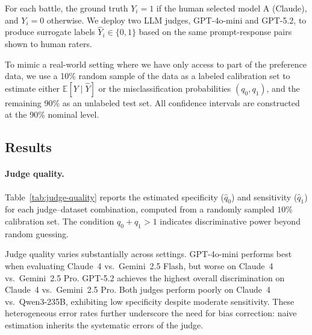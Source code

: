 \documentclass[11pt]{article}
\newcommand{\1}{\mathbf{1}}
\theoremstyle{remark}
\begin{document}
  For each battle, the ground truth $Y_i = 1$ if the human selected model A (Claude), and $Y_i = 0$ otherwise. We deploy two LLM judges, GPT-4o-mini and GPT-5.2, to produce surrogate labels $\widehat{Y}_i \in \{0, 1\}$ based on the same prompt-response pairs shown to human raters.

  To mimic a real-world setting where we have only access to part of the preference data, we use a 10\% random sample of the data as a labeled calibration set to estimate either $\mathbb{E}[Y \mid \hat{Y}]$ or the misclassification probabilities $(q_0, q_1)$, and the remaining 90\% as an unlabeled test set. All confidence intervals are constructed at the 90\% nominal level.
 \subsection{Results}

\paragraph{Judge quality.}
Table~\ref{tab:judge-quality} reports the estimated specificity ($\hat q_0$) and sensitivity ($\hat q_1$) for each judge--dataset combination, computed from a randomly sampled $10\%$ calibration set.
The condition $q_0 + q_1 > 1$ indicates discriminative power beyond random guessing.

Judge quality varies substantially across settings.
GPT-4o-mini performs best when evaluating Claude~4 vs.\ Gemini~2.5 Flash, but worse on Claude~4 vs.\ Gemini~2.5 Pro.
GPT-5.2 achieves the highest overall discrimination on Claude~4 vs.\ Gemini~2.5 Pro.
Both judges perform poorly on Claude~4 vs.\ Qwen3-235B, exhibiting low specificity despite moderate sensitivity.
These heterogeneous error rates further underscore the need for bias correction: naive estimation inherits the systematic errors of the judge.
\end{document}
